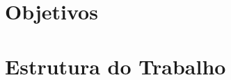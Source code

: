 





\section{Objetivos}
\label{cap1:Sec:Objetivos}


\section{Estrutura do Trabalho}
\label{cap1:Sec:EstruturaTrabalho}


